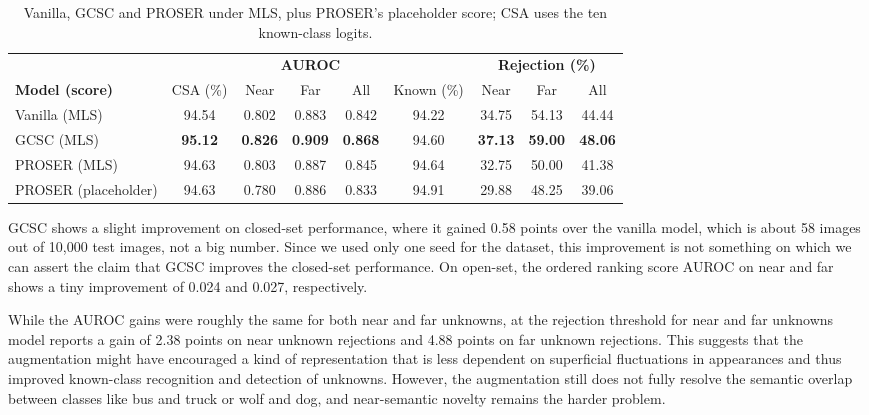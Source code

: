 \begin{table}[htbp]
  \caption{Vanilla, GCSC and PROSER under MLS, plus PROSER's placeholder score; CSA uses the ten known-class logits.}
  \label{tab:task4_models}
  \centering
  \small
  \setlength{\tabcolsep}{3.5pt}
  \begin{tabular}{lcccccccc}
    \toprule
    & & \multicolumn{3}{c}{\textbf{AUROC}} & & \multicolumn{3}{c}{\textbf{Rejection (\%)}} \\
    \cmidrule(lr){3-5} \cmidrule(lr){7-9}
    \textbf{Model (score)} & CSA (\%) & Near & Far & All & Known (\%) & Near & Far & All \\
    \midrule
    Vanilla (MLS)            & 94.54 & 0.802 & 0.883 & 0.842 & 94.22 & 34.75 & 54.13 & 44.44 \\
    GCSC (MLS)               & \textbf{95.12} & \textbf{0.826} & \textbf{0.909} & \textbf{0.868} & 94.60 & \textbf{37.13} & \textbf{59.00} & \textbf{48.06} \\
    PROSER (MLS)             & 94.63 & 0.803 & 0.887 & 0.845 & 94.64 & 32.75 & 50.00 & 41.38 \\
    PROSER (placeholder)     & 94.63 & 0.780 & 0.886 & 0.833 & 94.91 & 29.88 & 48.25 & 39.06 \\
    \bottomrule
  \end{tabular}
\end{table}

GCSC shows a slight improvement on closed-set performance, where it gained 0.58 points over the vanilla model, which is about 58 images out of 10,000 test images, not a big number. Since we used only one seed for the dataset, this improvement is not something on which we can assert the claim that GCSC improves the closed-set performance. On open-set, the ordered ranking score AUROC on near and far shows a tiny improvement of 0.024 and 0.027, respectively.

While the AUROC gains were roughly the same for both near and far unknowns, at the rejection threshold for near and far unknowns model reports a gain of 2.38 points on near unknown rejections and 4.88 points on far unknown rejections. This suggests that the augmentation might have encouraged a kind of representation that is less dependent on superficial fluctuations in appearances and thus improved known-class recognition and detection of unknowns. However, the augmentation still does not fully resolve the semantic overlap between classes like bus and truck or wolf and dog, and near-semantic novelty remains the harder problem.

